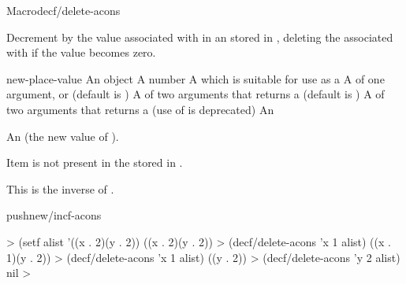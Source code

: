 \documentclass[10pt,twoside,english,pdftex]{article}
\begin{document}

\begin{functiondoc}{Macro}{decf/delete-acons}{%
    }
%
%
%
%
  
\fnsyntax

\fnpurpose Decrement by  the value associated with
 in an  stored in , deleting
the  associated with  if the value becomes zero.

\fnpackage {}

\fnmodule {}

\fnargs
\begin{args}{new-place-value}
\arg[item] An object
\arg[decrement] A number
\arg[place] A  which is suitable for use as a
\arg[key] A  of one argument, or \nil{} (default is \nil)
\arg[test] A  of two arguments that returns a
 (default is ) 
 A  of two arguments that returns a
 (use of  is deprecated)
 An  
\end{args}

\fnreturns An  (the new value of ). 

\fnerrors Item  is not present in the 
stored in .

\fndescription
This is the inverse of .

\begin{alsos}{pushnew/incf-acons}
\end{alsos}

\fnexamples
%
\W\supp
\begin{example}
  > (setf alist '((x . 2)(y . 2))
  ((x . 2)(y . 2))
  > (decf/delete-acons 'x 1 alist)
  ((x . 1)(y . 2))
  > (decf/delete-acons 'x 1 alist)
  ((y . 2))\goodpagebreak
  > (decf/delete-acons 'y 2 alist)
  nil
  >
\end{example}


\end{functiondoc}
\end{document}
